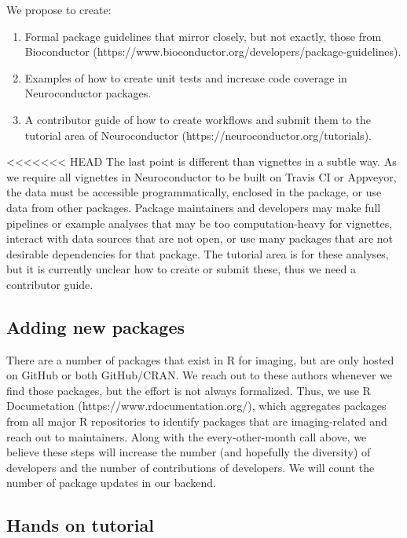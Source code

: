 \documentclass[]{elsarticle} %
\providecommand{\tightlist}{%
  \setlength{\itemsep}{0pt}\setlength{\parskip}{0pt}}
\begin{document}
We propose to create:

\begin{enumerate}
\def\labelenumi{\arabic{enumi}.}
\tightlist
\item
  Formal package guidelines that mirror closely, but not exactly, those
  from Bioconductor
  (https://www.bioconductor.org/developers/package-guidelines).
\item
  Examples of how to create unit tests and increase code coverage in
  Neuroconductor packages.
\item
  A contributor guide of how to create workflows and submit them to the
  tutorial area of Neuroconductor
  (https://neuroconductor.org/tutorials).
\end{enumerate}

<<<<<<< HEAD
The last point is different than vignettes in a subtle way. As we require all vignettes in Neuroconductor to be built on Travis CI or Appveyor, the data must be accessible programmatically, enclosed in the package, or use data from other packages. Package maintainers and developers may make full pipelines or example analyses that may be too computation-heavy for vignettes, interact with data sources that are not open, or use many packages that are not desirable dependencies for that package. The tutorial area is for these analyses, but it is currently unclear how to create or submit these, thus we need a contributor guide.

\hypertarget{adding-new-packages}{%
\subsection{Adding new packages}\label{adding-new-packages}}

There are a number of packages that exist in R for imaging, but are only hosted on GitHub or both GitHub/CRAN. We reach out to these authors whenever we find those packages, but the effort is not always formalized. Thus, we use R Documetation (https://www.rdocumentation.org/), which aggregates packages from all major R repositories to identify packages that are imaging-related and reach out to maintainers. Along with the every-other-month call above, we believe these steps will increase the number (and hopefully the diversity) of developers and the number of contributions of developers. We will count the number of package updates in our backend.

\hypertarget{hands-on-tutorial}{%
\subsection{Hands on tutorial}\label{hands-on-tutorial}}
\end{document}
